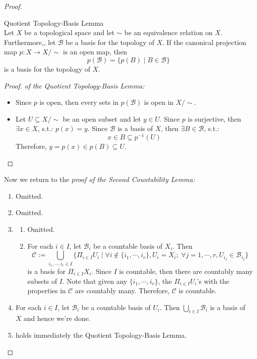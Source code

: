 \begin{proof}
    \begin{lemma}{Quotient Topology-Basis Lemma}\\
    Let $X$ be a topological space and let $\sim$ be an equivalence relation on $X$. Furthermore,, let $\mathcal{B}$ be a basis for the topology of $X$. If the canonical projection map $p:X \to X/\sim$ is an open map, then
    $$p(\mathcal{B}) = \{p(B) \mid B \in \mathcal{B} \}$$
    is a basis for the topology of $X$.
    \end{lemma}

    \begin{proof}
        \textit{of the Quotient Topology-Basis Lemma:} \begin{itemize}
            \item Since $p$ is open, then every sets in $p(\mathcal{B})$ is open in $X/\sim$.
            \item Let $U \subseteq X/\sim$ be an open subset and let $y \in U$. Since $p$ is surjective, then $\exists x\in X$, s.t.: $p(x)=y$. Since $\mathcal{B}$ is a basis of $X$, then $\exists B \in \mathcal{B}$, s.t.:
            $$x \in B \subseteq p^{-1}(U)$$
            Therefore, $y=p(x) \in  p(B) \subseteq U$.
        \end{itemize}
    \end{proof}

    Now we return to the \textit{proof of the Second Countability Lemma:} 
    \begin{enumerate}
        \item Omitted.
        \item Omitted.
        \item \begin{enumerate}
            \item Omitted.
            \item For each $i \in I$, let $\mathcal{B}_i$ be a countable basis of $X_i$. Then
            $$\mathcal{C} :=\bigcup_{i_1,\cdots, i_r \in I} \{ \Pi_{i \in I} U_i \mid \forall i\notin \{i_1 ,\cdots, i_r\}, U_i=X_i;\; \forall j =1,\cdots, r, U_{i_j} \in \mathcal{B}_{i_j} \} $$
            is a basis for $\Pi_{i \in I} X_i$. Since $I$ is countable, then there are countably many subsets of $I$. Note that given any $\{i_1 ,\cdots, i_r\}$, the $\Pi_{i \in I}U_i$'s with the properties in $\mathcal{C}$ are countably many. Therefore, $\mathcal{C}$ is countable.
        \end{enumerate}

        \item For each $i \in I$, let $\mathcal{B}_i$ be a countable basis of $U_i$. Then $\bigcup_{i \in I} \mathcal{B}_i$ is a basis of $X$ and hence we're done.
        \item holds immediately the Quotient Topology-Basis Lemma.
    \end{enumerate}
\end{proof}

